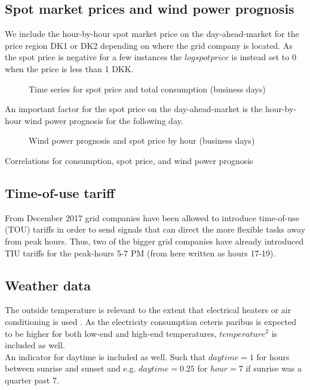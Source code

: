 \subsection{Spot market prices and wind power prognosis}
\label{subsec:d_spot}
We include the hour-by-hour spot market price on the day-ahead-market for the price region DK1 or DK2 depending on where the grid company is located. As the spot price is negative for a few instances the $log spot price$ is instead set to 0 when the price is less than 1 DKK.
\begin{figure}[H]
  \centering
  \caption{Time series for spot price and total consumption (business days)}
  \label{fig:price_cons_time_series}
\end{figure}
An important factor for the spot price on the day-ahead-market is the hour-by-hour wind power prognosis for the following day.
\begin{figure}[H]
  \centering
  \caption{Wind power prognosis and spot price by hour (business days)}
  \label{fig:wp_price_hour}
\end{figure}


\begin{table}[H]
  \centering
  \caption{Correlations for consumption, spot price, and wind power prognosis}
  \footnotesize
  \label{tab:correlations}
\end{table}


\subsection{Time-of-use tariff}
\label{subsec:d_tout}
From December 2017 grid companies have been allowed to introduce time-of-use (TOU) tariffs in order to send signals that can direct the more flexible tasks away from peak hours. Thus, two of the bigger grid companies have already introduced TIU tariffs for the peak-hours 5-7 PM (from here written as hours 17-19).

\subsection{Weather data}
\label{subsec:d_weather}
The outside temperature is relevant to the extent that electrical heaters or air conditioning is used \citep{lijesen2007real, vesterberg2014residential}. As the electricity consumption ceteris paribus is expected to be higher for both low-end and high-end temperatures, $temperature^2$ is included as well.
\medskip\\
An indicator for daytime is included as well. Such that $daytime=1$ for hours between sunrise and sunset and e.g. $daytime=0.25$ for $hour=7$ if sunrise was a quarter past 7.

